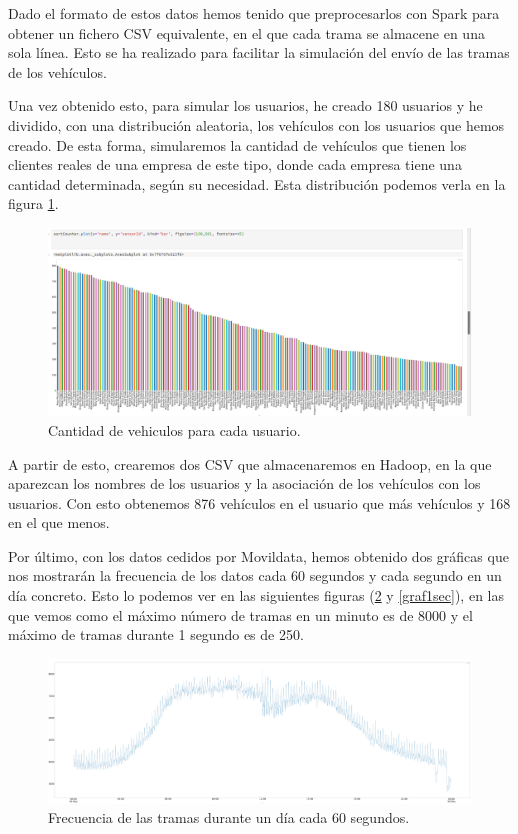 Dado el formato de estos datos hemos tenido que preprocesarlos con Spark para obtener un fichero CSV equivalente, en el que cada trama se almacene en una sola línea. Esto se ha realizado para facilitar la simulación del envío de las tramas de los vehículos.\par

Una vez obtenido esto, para simular los usuarios, he creado 180 usuarios y he dividido, con una distribución aleatoria, los vehículos con los usuarios que hemos creado. De esta forma, simularemos la cantidad de vehículos que tienen los clientes reales de una empresa de este tipo, donde cada empresa tiene una cantidad determinada, según su necesidad. Esta distribución podemos verla en la figura \ref{userGraf}.\par

\begin{figure}[htp]
\centering
\includegraphics[scale=0.3]{Imagenes/graf1.png}
\caption{Cantidad de vehiculos para cada usuario.}
\label{userGraf}
\end{figure}

A partir de esto, crearemos dos CSV que almacenaremos en Hadoop, en la que aparezcan los nombres de los usuarios y la asociación de los vehículos con los usuarios. Con esto obtenemos 876 vehículos en el usuario que más vehículos y 168 en el que menos.\par
Por último, con los datos cedidos por Movildata, hemos obtenido dos gráficas que nos mostrarán la frecuencia de los datos cada 60 segundos y cada segundo en un día concreto. Esto lo podemos ver en las siguientes figuras (\ref{graf60sec} y \ref{graf1sec}), en las que vemos como el máximo número de tramas en un minuto es de 8000 y el máximo de tramas durante 1 segundo es de 250.\par

\begin{figure}[htp]
\centering
\includegraphics[scale=0.26]{Imagenes/graf2.png}
\caption{Frecuencia de las tramas durante un día cada 60 segundos.}
\label{graf60sec}
\end{figure}

